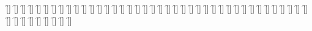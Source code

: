 \begin{questions}
\begin{multicols}{2}
        \question \f[]
        \question \f[]
        \question \f[]
        \question \f[]
        \question \f[]
        \question \f[]
        \question \f[]
        \question \f[]
        \question \f[]
        \question \f[]
        \question \f[]
        \question \f[]
        \question \f[]
        \question \f[]
        \question \f[]
        \question \f[]
        \question \f[]
        \question \f[]
        \question \f[]
        \question \f[]
        \question \f[]
        \question \f[]
        \question \f[]
        \question \f[]
        \question \f[]
        \question \f[]
        \question \f[]
        \question \f[]
        \question \f[]
        \question \f[]
        \question \f[]
        \question \f[]
        \question \f[]
        \question \f[]
        \question \f[]
        \question \f[]
        \question \f[]
        \question \f[]
        \question \f[]
        \question \f[]
        \question \f[]
        \question \f[]
        \question \f[]
        \question \f[]
        \question \f[]
        \question \f[]
        \question \f[]
        \question \f[]
        \question \f[]
    \end{multicols}
\end{questions}
